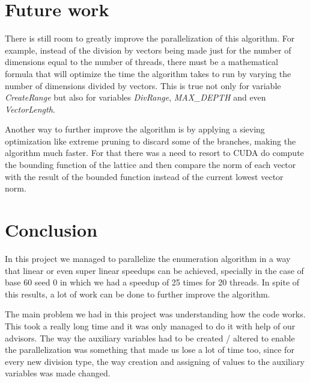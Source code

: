 \documentclass[conference]{IEEEtran}
\begin{document}
\section{Future work}
There is still room to greatly improve the parallelization of this algorithm. 
For example, instead of the division by vectors being made just for the number of dimensions equal to the number of threads, there must be a mathematical formula that will optimize the time the algorithm takes to run by varying the number of dimensions divided by vectors. This is true not only for variable \emph{CreateRange} but also for variables \emph{DivRange}, \emph{MAX\_DEPTH} and even \emph{VectorLength}.

Another way to further improve the algorithm is by applying a sieving optimization like extreme pruning to discard some of the branches, making the algorithm much faster. For that there was a need to resort to CUDA do compute the bounding function of the lattice and then compare the norm of each vector with the result of the bounded function instead of the current lowest vector norm.


\section{Conclusion}
In this project we managed to parallelize the enumeration algorithm in a way that linear or even super linear speedups can be achieved, specially in the case of base 60 seed 0 in which we had a speedup of 25 times for 20 threads.
In spite of this results, a lot of work can be done to further improve the algorithm.

The main problem we had in this project was understanding how the code works. This took a really long time and it was only managed to do it with help of our advisors. The way the auxiliary variables had to be created / altered to enable the parallelization was something that made us lose a lot of time too, since for every new division type, the way creation and assigning of values to the auxiliary variables was made changed.
\end{document}
